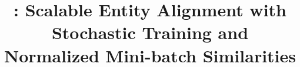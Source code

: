 \documentclass[sigconf, anonymous, review]{acmart}
\begin{document}

\title{\ClusterEA{}: Scalable Entity Alignment with Stochastic Training and Normalized Mini-batch Similarities}

%







\end{document}
